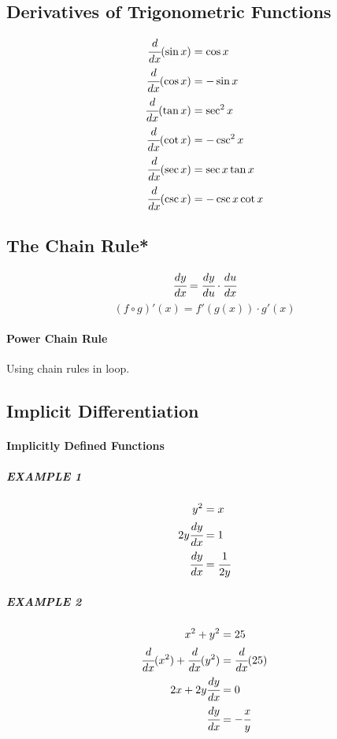 \documentclass{article}
\begin{document}
        \subsection{Derivatives of Trigonometric Functions}
            \begin{equation}
                \begin{aligned}
                    \cfrac{d}{dx}(\sin x)&=\cos x\\
                    \cfrac{d}{dx}(\cos x)&=-\sin x\\
                    \cfrac{d}{dx}(\tan x)&=\sec ^2 x\\
                    \cfrac{d}{dx}(\cot x)&=-\csc ^2 x\\
                    \cfrac{d}{dx}(\sec x)&=\sec x \tan x\\
                    \cfrac{d}{dx}(\csc x)&=-\csc x \cot x\\
                \end{aligned} 
            \end{equation}
        \subsection{The Chain Rule*}
            \[\cfrac{dy}{dx}=\cfrac{dy}{du}\cdot\cfrac{du}{dx}\]
            \[(f\circ g)'(x)=f'(g(x))\cdot g'(x)\]
            \paragraph{Power Chain Rule} Using chain rules in loop.
        \subsection{Implicit Differentiation}
            \paragraph{Implicitly Defined Functions}
                \subparagraph{EXAMPLE 1}
                    \begin{equation}
                        \begin{aligned}
                            y^2&=x\\
                            2y\cfrac{dy}{dx}&=1\\
                            \cfrac{dy}{dx}&=\cfrac{1}{2y}
                        \end{aligned}  
                    \end{equation}
                \subparagraph{EXAMPLE 2}
                    \begin{equation}
                        \begin{aligned}
                            x^2+y^2&=25\\
                            \cfrac{d}{dx}(x^2)+\cfrac{d}{dx}(y^2)&=\cfrac{d}{dx}(25)\\
                            2x+2y\cfrac{dy}{dx}&=0\\
                            \cfrac{dy}{dx}&=-\cfrac{x}{y}
                        \end{aligned} 
                    \end{equation}
\end{document}
